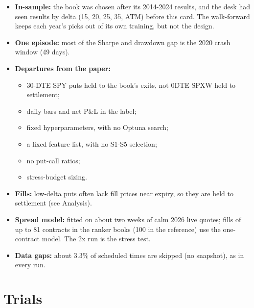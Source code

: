 \documentclass{article}
\begin{document}
\begin{itemize}

\item \textbf{In-sample:} the book was chosen after its 2014-2024 results, and the desk had seen results by delta (15, 20, 25, 35, ATM) before this card. The walk-forward keeps each year's picks out of its own training, but not the design.

\item \textbf{One episode:} most of the Sharpe and drawdown gap is the 2020 crash window (49 days).

\item \textbf{Departures from the paper:}

\begin{itemize}

\item 30-DTE SPY puts held to the book's exits, not 0DTE SPXW held to settlement;

\item daily bars and net P\&L in the label;

\item fixed hyperparameters, with no Optuna search;

\item a fixed feature list, with no S1-S5 selection;

\item no put-call ratios;

\item stress-budget sizing.

\end{itemize}

\item \textbf{Fills:} low-delta puts often lack fill prices near expiry, so they are held to settlement (see Analysis).

\item \textbf{Spread model:} fitted on about two weeks of calm 2026 live quotes; fills of up to 81 contracts in the ranker books (100 in the reference) use the one-contract model. The 2x run is the stress test.

\item \textbf{Data gaps:} about 3.3\% of scheduled times are skipped (no snapshot), as in every run.

\end{itemize}

\section{Trials}
\end{document}
